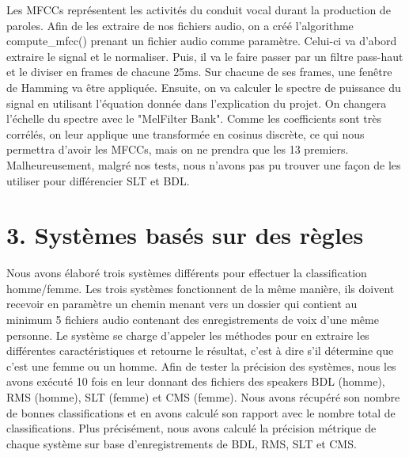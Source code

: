 \documentclass[a4paper,12pt]{report}	%
\begin{document}
Les MFCCs représentent les activités du conduit vocal durant la production de paroles. Afin de les extraire de nos fichiers audio, on a créé l'algorithme compute\_mfcc() prenant un fichier audio comme paramètre. Celui-ci va d'abord extraire le signal et le normaliser. Puis, il va le faire passer par un filtre pass-haut et le diviser en frames de chacune 25ms. Sur chacune de ses frames, une fenêtre de Hamming va être appliquée. Ensuite, on va calculer le spectre de puissance du signal en utilisant l'équation donnée dans l'explication du projet. On changera l'échelle du spectre avec le "Mel\-Filter Bank". Comme les coefficients sont très corrélés, on leur applique une transformée en cosinus discrète, ce qui nous permettra d'avoir les MFCCs, mais on ne prendra que les 13 premiers.
Malheureusement, malgré nos tests, nous n'avons pas pu trouver une façon de les utiliser pour différencier SLT et BDL.
	
\newpage
{\section*{3. Systèmes basés sur des règles}}
Nous avons élaboré trois systèmes différents pour effectuer la classification homme/femme. Les trois systèmes fonctionnent de la même manière, ils doivent recevoir en paramètre un chemin menant vers un dossier qui contient au minimum 5 fichiers audio contenant des enregistrements de voix d'une même personne. Le système se charge d'appeler les méthodes pour en extraire les différentes caractéristiques et retourne le résultat, c'est à dire s'il détermine que c'est une femme ou un homme. Afin de tester la précision des systèmes, nous les avons exécuté 10 fois en leur donnant des fichiers des speakers BDL (homme), RMS (homme), SLT (femme) et CMS (femme). Nous avons récupéré son nombre de bonnes classifications et en avons calculé son rapport avec le nombre total de classifications. Plus précisément, nous avons calculé la précision métrique de chaque système sur base d'enregistrements de BDL, RMS, SLT et CMS.
\end{document}
